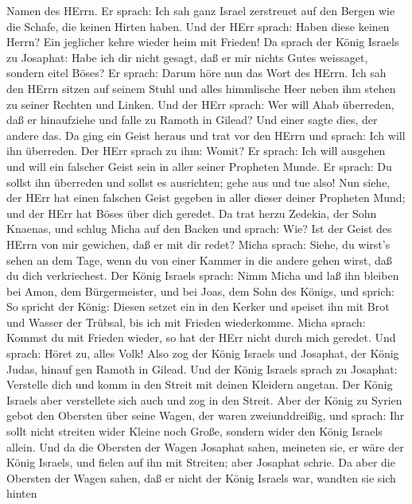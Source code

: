 Namen des HErrn.  Er sprach: Ich sah ganz Israel zerstreuet
auf den Bergen wie die Schafe, die keinen Hirten haben. Und der HErr
sprach: Haben diese keinen Herrn? Ein jeglicher kehre wieder heim mit
Frieden!  Da sprach der König Israels zu Josaphat: Habe ich
dir nicht gesagt, daß er mir nichts Gutes weissaget, sondern eitel
Böses?  Er sprach: Darum höre nun das Wort des HErrn. Ich
sah den HErrn sitzen auf seinem Stuhl und alles himmlische Heer neben
ihm stehen zu seiner Rechten und Linken.  Und der HErr
sprach: Wer will Ahab überreden, daß er hinaufziehe und falle zu Ramoth
in Gilead? Und einer sagte dies, der andere das.  Da ging
ein Geist heraus und trat vor den HErrn und sprach: Ich will ihn
überreden. Der HErr sprach zu ihm: Womit?  Er sprach: Ich
will ausgehen und will ein falscher Geist sein in aller seiner Propheten
Munde. Er sprach: Du sollst ihn überreden und sollst es ausrichten; gehe
aus und tue also!  Nun siehe, der HErr hat einen falschen
Geist gegeben in aller dieser deiner Propheten Mund; und der HErr hat
Böses über dich geredet.  Da trat herzu Zedekia, der Sohn
Knaenas, und schlug Micha auf den Backen und sprach: Wie? Ist der Geist
des HErrn von mir gewichen, daß er mit dir redet?  Micha
sprach: Siehe, du wirst's sehen an dem Tage, wenn du von einer Kammer in
die andere gehen wirst, daß du dich verkriechest.  Der
König Israels sprach: Nimm Micha und laß ihn bleiben bei Amon, dem
Bürgermeister, und bei Joas, dem Sohn des Königs,  und
sprich: So spricht der König: Diesen setzet ein in den Kerker und
speiset ihn mit Brot und Wasser der Trübsal, bis ich mit Frieden
wiederkomme.  Micha sprach: Kommst du mit Frieden wieder,
so hat der HErr nicht durch mich geredet. Und sprach: Höret zu, alles
Volk!  Also zog der König Israels und Josaphat, der König
Judas, hinauf gen Ramoth in Gilead.  Und der König Israels
sprach zu Josaphat: Verstelle dich und komm in den Streit mit deinen
Kleidern angetan. Der König Israels aber verstellete sich auch und zog
in den Streit.  Aber der König zu Syrien gebot den Obersten
über seine Wagen, der waren zweiunddreißig, und sprach: Ihr sollt nicht
streiten wider Kleine noch Große, sondern wider den König Israels
allein.  Und da die Obersten der Wagen Josaphat sahen,
meineten sie, er wäre der König Israels, und fielen auf ihn mit
Streiten; aber Josaphat schrie.  Da aber die Obersten der
Wagen sahen, daß er nicht der König Israels war, wandten sie sich hinten
